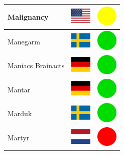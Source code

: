 \documentclass[12pt, a4paper, twoside]{report}
\begin{document}
\begin{center}
\begin{longtable}{|p{5cm}|p{2cm}|p{2cm}|}
 Malignancy                                                 & \includegraphics[width=1cm]{../4x3/us} &   \includegraphics[width=1cm]{../likes/m} \\ \hline
 Manegarm                                                   & \includegraphics[width=1cm]{../4x3/se} &   \includegraphics[width=1cm]{../likes/y} \\ \hline
 Maniacs Brainacts                                          & \includegraphics[width=1cm]{../4x3/de} &   \includegraphics[width=1cm]{../likes/y} \\ \hline
 Mantar                                                     & \includegraphics[width=1cm]{../4x3/de} &   \includegraphics[width=1cm]{../likes/y} \\ \hline
 Marduk                                                     & \includegraphics[width=1cm]{../4x3/se} &   \includegraphics[width=1cm]{../likes/y} \\ \hline
 Martyr                                                     & \includegraphics[width=1cm]{../4x3/nl} &   \includegraphics[width=1cm]{../likes/n} \\ \hline

\end{longtable}
\end{center}
\end{document}
